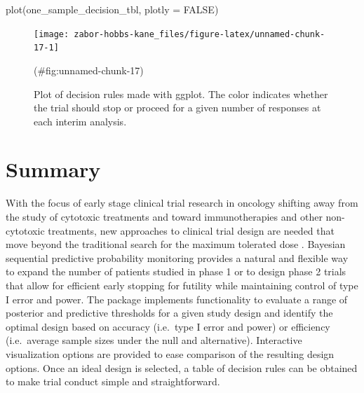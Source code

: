 \begin{Schunk}
\begin{Sinput}
plot(one_sample_decision_tbl, plotly = FALSE)
\end{Sinput}
\begin{figure}
\texttt{[image: zabor-hobbs-kane\_files/figure-latex/unnamed-chunk-17-1]} \caption[Plot of decision rules made with ggplot]{Plot of decision rules made with ggplot. The color indicates whether the trial should stop or proceed for a given number of responses at each interim analysis.}(\#fig:unnamed-chunk-17)
\end{figure}
\end{Schunk}

\hypertarget{summary}{%
\section{Summary}\label{summary}}

With the focus of early stage clinical trial research in oncology
shifting away from the study of cytotoxic treatments and toward
immunotherapies and other non-cytotoxic treatments, new approaches to
clinical trial design are needed that move beyond the traditional search
for the maximum tolerated dose \citep{Hobbs2019}. Bayesian sequential
predictive probability monitoring provides a natural and flexible way to
expand the number of patients studied in phase 1 or to design phase 2
trials that allow for efficient early stopping for futility while
maintaining control of type I error and power. The 
package implements functionality to evaluate a range of posterior and
predictive thresholds for a given study design and identify the optimal
design based on accuracy (i.e.~type I error and power) or efficiency
(i.e.~average sample sizes under the null and alternative). Interactive
visualization options are provided to ease comparison of the resulting
design options. Once an ideal design is selected, a table of decision
rules can be obtained to make trial conduct simple and straightforward.

\begin{verbatim}
\end{verbatim}



\address{%
Emily C. Zabor\\
Department of Quantitative Health Sciences \& Taussig Cancer Institute,
Cleveland Clinic\\%
9500 Euclid Ave. CA-60\\ Cleveland, OH 44195 USA\\
%
\url{http://www.emilyzabor.com/}\\%
\textit{ORCiD: \href{https://orcid.org/0000-0002-1402-4498}{0000-0002-1402-4498}}\\%
\href{mailto:zabore2@ccf.org}{\nolinkurl{zabore2@ccf.org}}%
}

